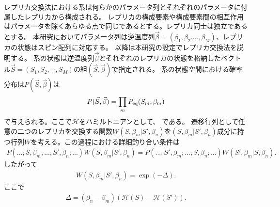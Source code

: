 \documentclass[12pt,titlepage,dvipdfmx]{jarticle}
\begin{document}
レプリカ交換法における系は何らかのパラメータ列とそれぞれのパラメータに付属したレプリカから構成される。
レプリカの構成要素や構成要素間の相互作用はパラメータを除くあらゆる点で同じであるとする。レプリカ同士は独立であるとする。
本研究においてパラメータ列は逆温度列$\vec{\beta} = (\beta_1, \beta_2. ..., \beta_M)$、レプリカの状態はスピン配列に対応する。
以降は本研究の設定でレプリカ交換法を説明する。
系の状態は逆温度列$\vec{\beta}$とそれぞれのレプリカの状態を格納したベクトル$\vec{S} = (S_1,S_2,\cdots,S_M)$の組$(\vec{S},\vec{\beta} )$で指定される。
系の状態空間における確率分布は$P(\vec{S},\vec{\beta})$は
\begin{align}
   P(\vec{S},\vec{\beta}) = \prod_m P_{\rm eq}(S_m, \beta_m)
\end{align}
で与えられる。ここで$\mathcal{H}$をハミルトニアンとして、
である。
遷移行列として任意の二つのレプリカを交換する関数$W(S,\beta_m|S',\beta_n)$を$(S,\beta_m |S',\beta_n)$成分に持つ行列$W$を考える。この過程における詳細釣り合い条件は
\begin{align}
   P\left(...;S,\beta_m;...;S',\beta_n;...\right)W\left(S,\beta_m|S',\beta_n\right) = P\left(...;S',\beta_m;...;S,\beta_n;...\right)W\left(S',\beta_m|S,\beta_n\right).
\end{align}
したがって
\begin{align}
W\left(S,\beta_m|S',\beta_n\right) = \exp(-\Delta).
\end{align}
ここで
\begin{align}
\Delta = (\beta_n - \beta_m)\left(\mathcal{H}(S) - \mathcal{H}(S')\right).
\end{align}
\end{document}
